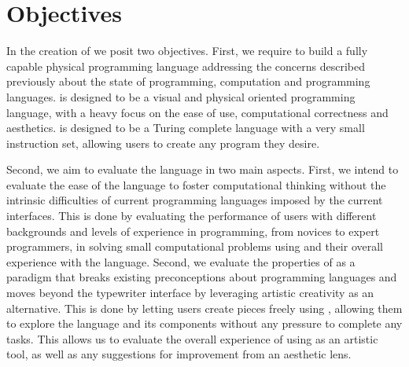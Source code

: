 \section{Objectives}
\label{sec:objectives}
In the creation of \sculpt we posit two objectives.
First, we require to build a fully capable physical programming language addressing the concerns described previously about the state of programming, computation and programming languages.
\sculpt is designed to be a visual and physical oriented programming language, with a heavy focus on the ease of use, computational correctness and aesthetics.
\sculpt is designed to be a Turing complete language with a very small instruction set, allowing users to create any program they desire.

Second, we aim to evaluate the language in two main aspects.
First, we intend to evaluate the ease of the language to foster computational thinking without the intrinsic difficulties of current programming languages imposed by the current interfaces.
This is done by evaluating the performance of users with different backgrounds and levels of experience in programming, from novices to expert programmers, in solving small computational problems using \sculpt
and their overall experience with the language.
Second, we evaluate the properties of \sculpt as a paradigm that breaks existing preconceptions about programming languages and moves beyond 
the typewriter interface by leveraging artistic creativity as an alternative.
This is done by letting users create pieces freely using \sculpt, allowing them to explore the language and its components without any pressure to complete any tasks.
This allows us to evaluate the overall experience of using \sculpt as an artistic tool, as well as any suggestions for improvement from an aesthetic lens.
\endinput